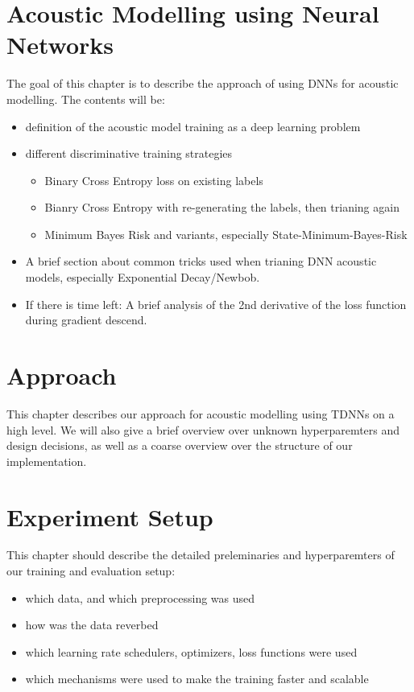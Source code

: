 \chapter{Acoustic Modelling using Neural Networks}
\label{ch:acoustic_modelling}
The goal of this chapter is to describe the approach of using DNNs for acoustic modelling.
The contents will be: 
\begin{itemize}
    \item definition of the acoustic model training as a deep learning problem
    \item different discriminative training strategies
    \begin{itemize}
        \item Binary Cross Entropy loss on existing labels
        \item Bianry Cross Entropy with re-generating the labels, then trianing again
        \item Minimum Bayes Risk and variants, especially State-Minimum-Bayes-Risk
    \end{itemize}
    \item A brief section about common tricks used when trianing DNN acoustic models, 
          especially Exponential Decay/Newbob.
    \item If there is time left: A brief analysis of the 2nd derivative of the loss function
    during gradient descend.
\end{itemize}

\chapter{Approach}
\label{ch:approach}
This chapter describes our approach for acoustic modelling using TDNNs on a high level. 
We will also give a brief overview over unknown hyperparemters and design decisions,
as well as a coarse overview over the structure of our implementation. 

\chapter{Experiment Setup}
\label{ch:experiment_setup}
This chapter should describe the detailed preleminaries and hyperparemters of our training and evaluation setup:
\begin{itemize}
    \item which data, and which preprocessing was used
    \item how was the data reverbed
    \item which learning rate schedulers, optimizers, loss functions were used
    \item which mechanisms were used to make the training faster and scalable
\end{itemize}

